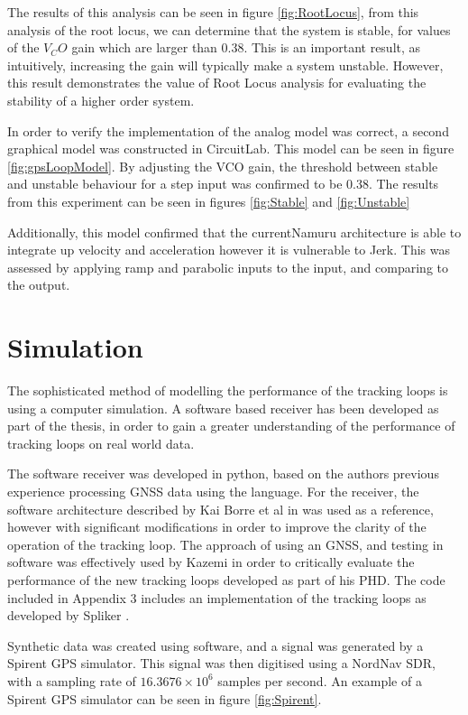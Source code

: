 The results of this analysis can be seen in figure \ref{fig:RootLocus}, from this analysis of the root locus, we can determine  that the system is stable, for values of the $V_CO$ gain which are larger than 0.38. This is an important result, as intuitively, increasing the gain will typically make a system unstable. However, this result demonstrates the value of Root Locus analysis for evaluating the stability of a higher order system.



In order to verify the implementation of the analog model was correct, a second graphical model was constructed in CircuitLab. This model can be seen in figure \ref{fig:gpsLoopModel}. By adjusting the VCO gain, the threshold between stable and unstable behaviour for a step input was confirmed to be 0.38. The results from this experiment can be seen in figures \ref{fig:Stable} and \ref{fig:Unstable}


Additionally, this model confirmed that the currentNamuru architecture is able to integrate up velocity and acceleration however it is vulnerable to Jerk. This was assessed by applying ramp and parabolic inputs to the input, and comparing to the output.

\section{Simulation}

The sophisticated method of modelling the performance of the tracking loops is using a computer simulation. A software based receiver has been developed as part of the thesis, in order to gain a greater understanding of the performance of tracking loops on real world data. 

The software receiver was developed in python, based on the authors previous experience processing GNSS data using the language. For the receiver, the software architecture described by Kai Borre et al in \cite{KaiBorre} was used as a reference, however with significant modifications in order to improve the clarity of the operation of the tracking loop. The approach of using an \ac{GNSS}, and testing in software was effectively used by Kazemi \cite{KazemiPHD} in order to critically evaluate the performance of the new tracking loops developed as part of his PHD. The code included in Appendix 3 includes an implementation of the tracking loops as developed by Spliker \cite{Spilker}.

Synthetic data was created using software, and a signal was generated by a Spirent \ac{GPS} simulator. This signal was then digitised using a NordNav \ac{SDR}, with a sampling rate of $16.3676 \times 10^6$ samples per second. An example of a Spirent \ac{GPS} simulator can be seen in figure \ref{fig:Spirent}.

